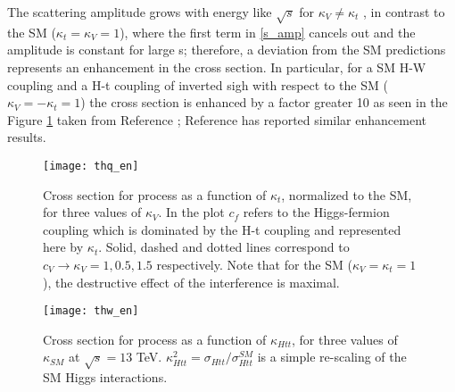 The scattering amplitude grows with energy like $\sqrt{s}$ for $\kappa_V \neq \kappa_t$ , in contrast to the SM ($\kappa_t=\kappa_V=1$), where the first term in \ref{s_amp} cancels out and the amplitude is constant for large s; therefore, a deviation from the SM predictions represents an enhancement in the \tHq cross section. In particular, for a SM H-W coupling and a H-t coupling of inverted sigh with respect to the SM ($\kappa_V =-\kappa_t=1$) the \tHq cross section is enhanced by a factor greater 10 as seen in the Figure \ref{thq_en} taken from Reference \cite{farina}; Reference \cite{biswas2} has reported similar enhancement results.

\begin{figure}[h!]
\centering
\texttt{[image: thq\_en]}\\
\caption[Cross section for \tHq process as a function of $\kappa_t$]{Cross section for \tHq process as a function of $\kappa_t$, normalized to the SM, for three values of $\kappa_V$. In the plot $c_f$ refers to the Higgs-fermion coupling which is dominated by the H-t coupling and represented here by $\kappa_t$. Solid, dashed and dotted lines correspond to $c_V \to \kappa_V= 1, 0.5, 1.5$ respectively. Note that for the SM ($\kappa_V=\kappa_t=1$), the destructive effect of the interference is maximal.} 
\label{thq_en}
\end{figure}

\begin{figure}[h!]
\centering
\texttt{[image: thw\_en]}\\
\caption[Cross section for \tHW process as a function of $\kappa_{Htt}$]{Cross section for \tHW process as a function of $\kappa_{Htt}$, for three values of $\kappa_{SM}$ at $\sqrt{s}=13$ TeV. $\kappa_{Htt}^2=\sigma_{Htt}/\sigma_{Htt}^{SM}$ is a simple re-scaling of the SM Higgs interactions.} 
\label{thw_en}
\end{figure}

